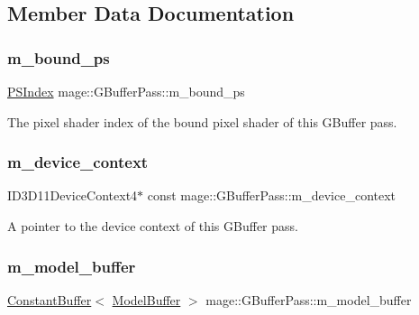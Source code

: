 \subsection{Member Data Documentation}
\hypertarget{classmage_1_1_g_buffer_pass_aef8452f64c9815d002e552957ed9e342}{}\label{classmage_1_1_g_buffer_pass_aef8452f64c9815d002e552957ed9e342} 
\subsubsection{\texorpdfstring{m\+\_\+bound\+\_\+ps}{m\_bound\_ps}}
{\footnotesize\ttfamily \hyperlink{classmage_1_1_g_buffer_pass_a23039b6695c10c88676c38fe63123571}{P\+S\+Index} mage\+::\+G\+Buffer\+Pass\+::m\+\_\+bound\+\_\+ps\hspace{0.3cm}{\ttfamily [private]}}

The pixel shader index of the bound pixel shader of this G\+Buffer pass. \hypertarget{classmage_1_1_g_buffer_pass_a56bcb08adf8a9b04a15efe24ef703c32}{}\label{classmage_1_1_g_buffer_pass_a56bcb08adf8a9b04a15efe24ef703c32} 
\subsubsection{\texorpdfstring{m\+\_\+device\+\_\+context}{m\_device\_context}}
{\footnotesize\ttfamily I\+D3\+D11\+Device\+Context4$\ast$ const mage\+::\+G\+Buffer\+Pass\+::m\+\_\+device\+\_\+context\hspace{0.3cm}{\ttfamily [private]}}

A pointer to the device context of this G\+Buffer pass. \hypertarget{classmage_1_1_g_buffer_pass_a0538769957df6740993dbb479b7e05a2}{}\label{classmage_1_1_g_buffer_pass_a0538769957df6740993dbb479b7e05a2} 
\subsubsection{\texorpdfstring{m\+\_\+model\+\_\+buffer}{m\_model\_buffer}}
{\footnotesize\ttfamily \hyperlink{classmage_1_1_constant_buffer}{Constant\+Buffer}$<$ \hyperlink{structmage_1_1_model_buffer}{Model\+Buffer} $>$ mage\+::\+G\+Buffer\+Pass\+::m\+\_\+model\+\_\+buffer\hspace{0.3cm}{\ttfamily [private]}}

